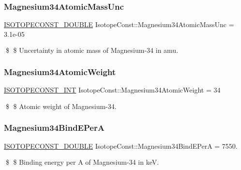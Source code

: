 \subsubsection{\texorpdfstring{Magnesium34\+Atomic\+Mass\+Unc}{Magnesium34AtomicMassUnc}}
{\footnotesize\ttfamily \mbox{\hyperlink{group___isotope_const-_macros_ga8f45a7272ce02c0b4c65c44636ed719a}{I\+S\+O\+T\+O\+P\+E\+C\+O\+N\+S\+T\+\_\+\+D\+O\+U\+B\+LE}} Isotope\+Const\+::\+Magnesium34\+Atomic\+Mass\+Unc = 3.\+1e-\/05}

\$ \$ Uncertainty in atomic mass of Magnesium-\/34 in amu. \mbox{\label{group___isotope_const-_magnesium-_mg34_ga9e116095f6487ce51f26fd0d227dfb2b}} 
\subsubsection{\texorpdfstring{Magnesium34\+Atomic\+Weight}{Magnesium34AtomicWeight}}
{\footnotesize\ttfamily \mbox{\hyperlink{group___isotope_const-_macros_ga5f18360b3e99483a35c32d789e62621c}{I\+S\+O\+T\+O\+P\+E\+C\+O\+N\+S\+T\+\_\+\+I\+NT}} Isotope\+Const\+::\+Magnesium34\+Atomic\+Weight = 34}

\$ \$ Atomic weight of Magnesium-\/34. \mbox{\label{group___isotope_const-_magnesium-_mg34_ga6955d584c30051c0d51bc5fd2f8fd04f}} 
\subsubsection{\texorpdfstring{Magnesium34\+Bind\+E\+PerA}{Magnesium34BindEPerA}}
{\footnotesize\ttfamily \mbox{\hyperlink{group___isotope_const-_macros_ga8f45a7272ce02c0b4c65c44636ed719a}{I\+S\+O\+T\+O\+P\+E\+C\+O\+N\+S\+T\+\_\+\+D\+O\+U\+B\+LE}} Isotope\+Const\+::\+Magnesium34\+Bind\+E\+PerA = 7550.}

\$ \$ Binding energy per A of Magnesium-\/34 in keV. \mbox{\label{group___isotope_const-_magnesium-_mg34_ga3f49675539b2a955c6e3c08ff15c4acd}} 
